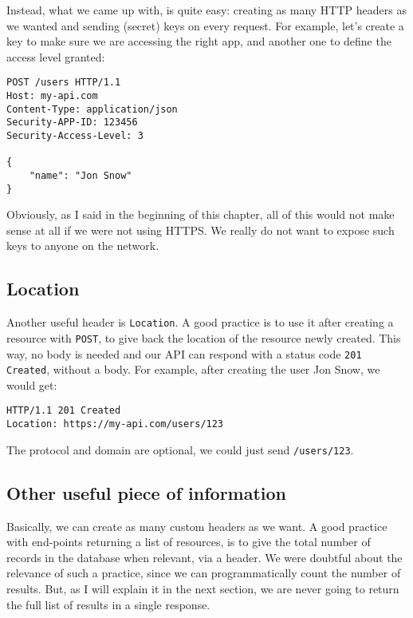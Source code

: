 \medskip

Instead, what we came up with, is quite easy: creating as many HTTP headers as we wanted and sending (secret) keys on every request. For example, let's create a key to make sure we are accessing the right app, and another one to define the access level granted:

\begin{lstlisting}
POST /users HTTP/1.1
Host: my-api.com
Content-Type: application/json
Security-APP-ID: 123456
Security-Access-Level: 3

{
    "name": "Jon Snow"
}
\end{lstlisting}

Obviously, as I said in the beginning of this chapter, all of this would not make sense at all if we were not using HTTPS. We really do not want to expose such keys to anyone on the network.

\subsection{Location}

Another useful header is \lstinline{Location}. A good practice is to use it after creating a resource with \lstinline{POST}, to give back the location of the resource newly created. This way, no body is needed and our API can respond with a status code \lstinline{201 Created}, without a body. For example, after creating the user Jon Snow, we would get:

\begin{lstlisting}
HTTP/1.1 201 Created
Location: https://my-api.com/users/123
\end{lstlisting}
The protocol and domain are optional, we could just send \lstinline{/users/123}.

\subsection{Other useful piece of information}

Basically, we can create as many custom headers as we want. A good practice with end-points returning a list of resources, is to give the total number of records in the database when relevant, via a header. We were doubtful about the relevance of such a practice, since we can programmatically count the number of results. But, as I will explain it in the next section, we are never going to return the full list of results in a single response.

